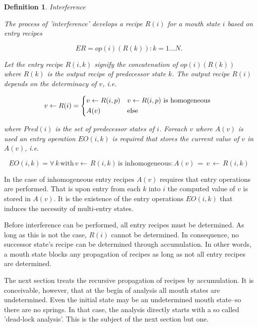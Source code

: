 \documentclass[12pt,a4paper]{scrartcl}
\newtheorem{definition}{Definition}
\begin{document}
\begin{definition}
Interference

The process of 'interference' develops a recipe $R(i)$ for a mouth state
$i$ based on entry recipes 

\begin{equation}
              ER = { op(i)(R(k)): k = 1...N }. 
\end{equation}
              
Let the entry recipe $R(i,k)$ signify the concatenation of $op(i)(R(k))$
where $R(k)$ is the output recipe of predecessor state $k$. The output
recipe $R(i)$ depends on the determinacy of $v$, i.e. 
          
\begin{equation}
    v \leftarrow R(i) = 
         \begin{dcases*}
            v \leftarrow R(i,p) & $v \leftarrow R(i,p)$ is homogeneous \\
            A(v)                & else
         \end{dcases*}
\end{equation}

where $Pred(i)$ is the set of predecessor states of $i$. Foreach $v$ where
$A(v)$ is used an entry operation $EO(i,k)$ is required that stores
the current value of $v$ in $A(v)$, i.e.

\begin{equation}
    EO(i,k) = { \forall\,k\,\mbox{with}\,v\leftarrow\,R(i,k)\,\mbox{is inhomogeneous}: A(v)\,=\,v\,\leftarrow\,R(i,k) }
\end{equation}

\end{definition}

In the case of inhomogeneous entry recipes $A(v)$ requires that entry
operations are performed.  That is upon entry from each $k$ into $i$ the
computed value of $v$ is stored in $A(v)$.  It is the existence of the entry
operations $EO(i,k)$ that induces the necessity of multi-entry states.  

Before interference can be performed, all entry recipes must be determined.  As
long as this is not the case, $R(i)$ cannot be determined. In consequence, no
successor state's recipe can be determined through accumulation. In other
words,  a mouth state blocks any propagation of recipes as long as not all
entry recipes are determined. 

The next section treats the recursive propagation of recipes by accumulation.
It is conceivable, however, that at the begin of analysis all mouth states are
undetermined. Even the initial state may be an undetermined mouth state--so
there are no springs. In that case, the analysis directly starts with a so
called 'dead-lock analysis'. This is the subject of the next section but one.
\end{document}
